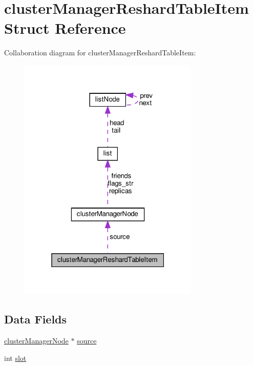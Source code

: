 \hypertarget{structcluster_manager_reshard_table_item}{}\section{cluster\+Manager\+Reshard\+Table\+Item Struct Reference}
\label{structcluster_manager_reshard_table_item}


Collaboration diagram for cluster\+Manager\+Reshard\+Table\+Item\+:
\nopagebreak
\begin{figure}[H]
\begin{center}
\leavevmode
\includegraphics[width=244pt]{structcluster_manager_reshard_table_item__coll__graph}
\end{center}
\end{figure}
\subsection*{Data Fields}
\begin{DoxyCompactItemize}
\item 
\hyperlink{structcluster_manager_node}{cluster\+Manager\+Node} $\ast$ \hyperlink{structcluster_manager_reshard_table_item_a081134bbad31a2e5f1ab9796878c9046}{source}
\item 
int \hyperlink{structcluster_manager_reshard_table_item_a83d6e2127b4cc5e01f2012608487d31a}{slot}
\end{DoxyCompactItemize}


